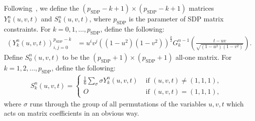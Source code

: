 \documentclass[12pt]{article}
\theoremstyle{remark}
\begin{document}
Following~\cite{bachoc08}, we define the $(p_{\text{SDP}}-k+1)\times(p_{\text{SDP}}-k+1)$
matrices $Y_k^n(u,v,t)$ and $S_k^n(u,v,t)$, where $p_{\text{SDP}}$ is the parameter of SDP matrix constraints.
For $k=0,1,\ldots,p_{\text{SDP}}$,
define the following:
\begin{align*}
(Y_k^n(u,v,t))_{i,j=0}^{p_{\text{SDP}} - k} &= u^iv^j((1-u^2)(1-v^2))^{\frac{k}{2}}G_k^{n-1}\left(\frac{t-uv}{\sqrt{(1-u^2)(1-v^2)}}\right).
\end{align*}
Define $S_0^n(u,v,t)$ to be the  
$(p_{\text{SDP}}+1) \times (p_{\text{SDP}}+1)$ all-one matrix.
For $k=1,2,\ldots,p_{\text{SDP}}$,
define the following:
\begin{align*}
S_k^n(u,v,t) = 
\begin{cases}
\frac{1}{6} \sum\limits_{\sigma} \sigma Y_k^n(u,v,t) &\text{ if } (u,v,t) \ne (1,1,1),\\
O  &\text{ if } (u,v,t) = (1,1,1),
\end{cases}
\end{align*}
where $\sigma$ runs through the group of all permutations of the variables $u,v,t$ 
which acts on matrix coefficients in an obvious way.
\end{document}
